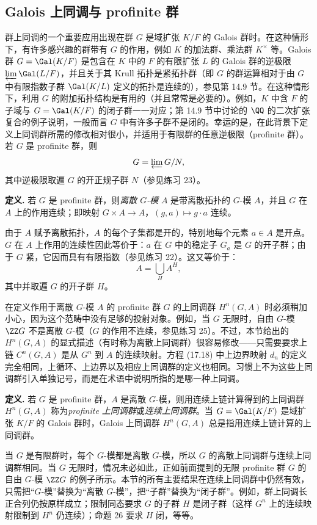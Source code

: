 \subsection*{Galois 上同调与 profinite 群}

群上同调的一个重要应用出现在群 $G$ 是域扩张 $K/F$ 的 Galois 群时。在这种情形下，有许多感兴趣的群带有 $G$ 的作用，例如 $K$ 的加法群、乘法群 $K^\times$ 等。Galois 群 $G=\Gal(K/F)$ 是包含在 $K$ 中的 $F$ 的有限扩张 $L$ 的 Galois 群的逆极限 $\varprojlim \Gal(L/F)$，并且关于其 Krull 拓扑是紧拓扑群（即 $G$ 的群运算相对于由 $G$ 中有限指数子群 $\Gal(K/L)$ 定义的拓扑是连续的），参见第 14.9 节。在这种情形下，利用 $G$ 的附加拓扑结构是有用的（并且常常是必要的）。例如，$K$ 中含 $F$ 的子域与 $G=\Gal(K/F)$ 的闭子群一一对应；第 14.9 节中讨论的 $\QQ$ 的二次扩张复合的例子说明，一般而言 $G$ 中有许多子群不是闭的。幸运的是，在此背景下定义上同调群所需的修改相对很小，并适用于有限群的任意逆极限（profinite 群）。若 $G$ 是 profinite 群，则
\[
  G=\varprojlim G/N,
\]
其中逆极限取遍 $G$ 的开正规子群 $N$（参见练习 23）。

\noindent\textbf{定义.} 若 $G$ 是 profinite 群，则\emph{离散 $G$-模} $A$ 是带离散拓扑的 $G$-模 $A$，并且 $G$ 在 $A$ 上的作用连续；即映射 $G\times A\to A$，$(g,a)\mapsto g\cdot a$ 连续。

由于 $A$ 赋予离散拓扑，$A$ 的每个子集都是开的，特别地每个元素 $a\in A$ 是开点。$G$ 在 $A$ 上作用的连续性因此等价于：$a$ 在 $G$ 中的稳定子 $G_a$ 是 $G$ 的开子群；由于 $G$ 紧，它因而具有有限指数（参见练习 22）。这又等价于：
\[
  A=\bigcup_H A^H,
\]
其中并取遍 $G$ 的开子群 $H$。

在定义作用于离散 $G$-模 $A$ 的 profinite 群 $G$ 的上同调群 $H^n(G,A)$ 时必须稍加小心，因为这个范畴中没有足够的投射对象。例如，当 $G$ 无限时，自由 $G$-模 $\ZZ G$ 不是离散 $G$-模（$G$ 的作用不连续，参见练习 25）。不过，本节给出的 $H^n(G,A)$ 的显式描述（有时称为离散上同调群）很容易修改——只需要要求上链 $C^n(G,A)$ 是从 $G^n$ 到 $A$ 的连续映射。方程 (17.18) 中上边界映射 $d_n$ 的定义完全相同，上循环、上边界以及相应上同调群的定义也相同。习惯上不为这些上同调群引入单独记号，而是在术语中说明所指的是哪一种上同调。

\noindent\textbf{定义.} 若 $G$ 是 profinite 群，$A$ 是离散 $G$-模，则用连续上链计算得到的上同调群 $H^n(G,A)$ 称为\emph{profinite 上同调群}或\emph{连续上同调群}。当 $G=\Gal(K/F)$ 是域扩张 $K/F$ 的 Galois 群时，Galois 上同调群 $H^n(G,A)$ 总是指用连续上链计算的上同调群。

当 $G$ 是有限群时，每个 $G$-模都是离散 $G$-模，所以 $G$ 的离散上同调群与连续上同调群相同。当 $G$ 无限时，情况未必如此，正如前面提到的无限 profinite 群 $G$ 的自由 $G$-模 $\ZZ G$ 的例子所示。本节的所有主要结果在连续上同调群中仍然有效，只需把“$G$-模”替换为“离散 $G$-模”，把“子群”替换为“闭子群”。例如，群上同调长正合列仍按原样成立；限制同态要求 $G$ 的子群 $H$ 是闭子群（这样 $G^n$ 上的连续映射限制到 $H^n$ 仍连续）；命题 26 要求 $H$ 闭，等等。

